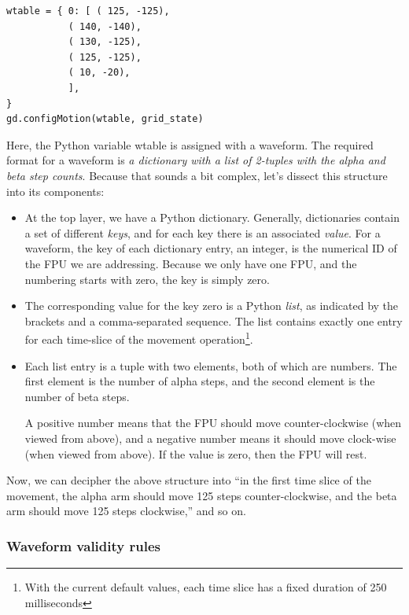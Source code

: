 \documentclass[11pt,a4paper]{report}
\begin{document}
\begin{verbatim}
wtable = { 0: [ ( 125, -125),
           ( 140, -140),
           ( 130, -125),
           ( 125, -125),
           ( 10, -20),
           ],
}
gd.configMotion(wtable, grid_state)
\end{verbatim}

Here, the Python variable wtable is assigned with
a waveform. The required format for a waveform
is \emph{a dictionary with a list of 2-tuples
  with the alpha and beta step counts}. Because
that sounds a bit complex, let's dissect this
structure into its components:

\begin{itemize}
  
\item At the top layer, we have a Python dictionary. Generally,
  dictionaries contain a set of different \emph{keys}, and for each
  key there is an associated \emph{value}. For a waveform, the key of
  each dictionary entry, an integer, is the numerical ID of the FPU we
  are addressing.  Because we only have one FPU, and the numbering
  starts with zero, the key is simply zero.

\item The corresponding value for the key zero is a Python
  \emph{list}, as indicated by the brackets and a comma-separated
  sequence. The list contains exactly one entry for each time-slice of
  the movement operation\footnote{With the current default values,
    each time slice has a fixed duration of 250 milliseconds}.

\item Each list entry is a tuple with two elements, both of which are
  numbers. The first element is the number of alpha steps, and the
  second element is the number of beta steps.

  A positive number means that the FPU should move counter-clockwise
  (when viewed from above), and a negative number means it should move
  clock-wise (when viewed from above). If the value is zero, then the
  FPU will rest.

\end{itemize}

Now, we can decipher the above structure into ``in the first time
slice of the movement, the alpha arm should move 125 steps
counter-clockwise, and the beta arm should move 125 steps
clockwise,'' and so on.

\subsubsection{Waveform validity rules}
\label{sec:validity_rulesets}
\end{document}
